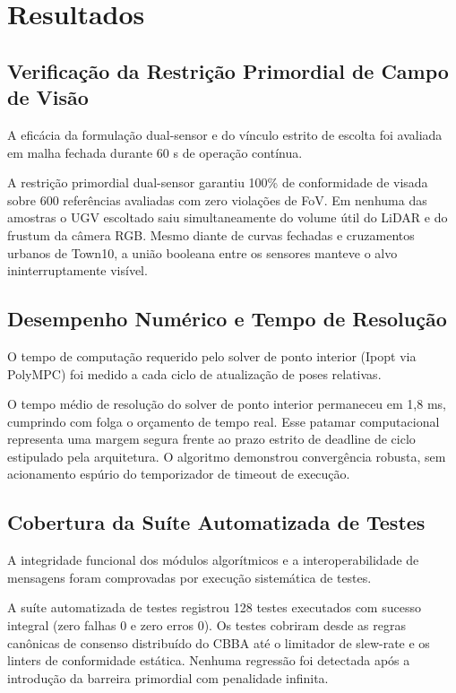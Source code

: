 \documentclass[
  brazilian,
  a4paper]{article}
\begin{document}
\section{Resultados}\label{resultados}

\subsection{Verificação da Restrição Primordial de Campo de
Visão}\label{verificauxe7uxe3o-da-restriuxe7uxe3o-primordial-de-campo-de-visuxe3o}

A eficácia da formulação dual-sensor e do vínculo estrito de escolta foi
avaliada em malha fechada durante 60 s de operação contínua.

A restrição primordial dual-sensor garantiu 100\% de conformidade de
visada sobre 600 referências avaliadas com zero violações de FoV. Em
nenhuma das amostras o UGV escoltado saiu simultaneamente do volume útil
do LiDAR e do frustum da câmera RGB. Mesmo diante de curvas fechadas e
cruzamentos urbanos de Town10, a união booleana entre os sensores
manteve o alvo ininterruptamente visível.

\subsection{Desempenho Numérico e Tempo de
Resolução}\label{desempenho-numuxe9rico-e-tempo-de-resoluuxe7uxe3o}

O tempo de computação requerido pelo solver de ponto interior (Ipopt via
PolyMPC) foi medido a cada ciclo de atualização de poses relativas.

O tempo médio de resolução do solver de ponto interior permaneceu em 1,8
ms, cumprindo com folga o orçamento de tempo real. Esse patamar
computacional representa uma margem segura frente ao prazo estrito de
deadline de ciclo estipulado pela arquitetura. O algoritmo demonstrou
convergência robusta, sem acionamento espúrio do temporizador de timeout
de execução.

\subsection{Cobertura da Suíte Automatizada de
Testes}\label{cobertura-da-suuxedte-automatizada-de-testes}

A integridade funcional dos módulos algorítmicos e a interoperabilidade
de mensagens foram comprovadas por execução sistemática de testes.

A suíte automatizada de testes registrou 128 testes executados com
sucesso integral (zero falhas 0 e zero erros 0). Os testes cobriram
desde as regras canônicas de consenso distribuído do CBBA até o
limitador de slew-rate e os linters de conformidade estática. Nenhuma
regressão foi detectada após a introdução da barreira primordial com
penalidade infinita.
\end{document}
